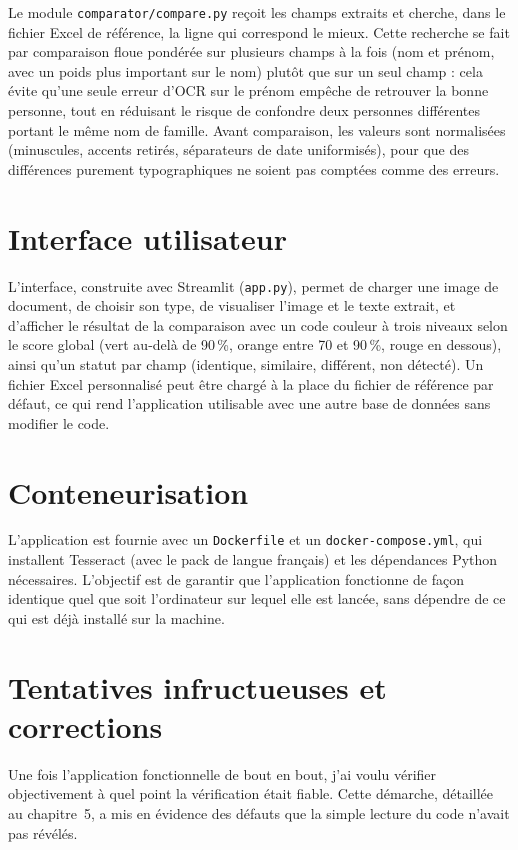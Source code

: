 Le module \texttt{comparator/compare.py} reçoit les champs extraits et cherche, dans le fichier Excel de référence, la ligne qui correspond le mieux. Cette recherche se fait par comparaison floue pondérée sur plusieurs champs à la fois (nom et prénom, avec un poids plus important sur le nom) plutôt que sur un seul champ : cela évite qu'une seule erreur d'OCR sur le prénom empêche de retrouver la bonne personne, tout en réduisant le risque de confondre deux personnes différentes portant le même nom de famille. Avant comparaison, les valeurs sont normalisées (minuscules, accents retirés, séparateurs de date uniformisés), pour que des différences purement typographiques ne soient pas comptées comme des erreurs.

\section{Interface utilisateur}

L'interface, construite avec Streamlit (\texttt{app.py}), permet de charger une image de document, de choisir son type, de visualiser l'image et le texte extrait, et d'afficher le résultat de la comparaison avec un code couleur à trois niveaux selon le score global (vert au-delà de 90\,\%, orange entre 70 et 90\,\%, rouge en dessous), ainsi qu'un statut par champ (identique, similaire, différent, non détecté). Un fichier Excel personnalisé peut être chargé à la place du fichier de référence par défaut, ce qui rend l'application utilisable avec une autre base de données sans modifier le code.

\section{Conteneurisation}

L'application est fournie avec un \texttt{Dockerfile} et un \texttt{docker-compose.yml}, qui installent Tesseract (avec le pack de langue français) et les dépendances Python nécessaires. L'objectif est de garantir que l'application fonctionne de façon identique quel que soit l'ordinateur sur lequel elle est lancée, sans dépendre de ce qui est déjà installé sur la machine.

\section{Tentatives infructueuses et corrections}
\label{sec:tentatives}

Une fois l'application fonctionnelle de bout en bout, j'ai voulu vérifier objectivement à quel point la vérification était fiable. Cette démarche, détaillée au chapitre~5, a mis en évidence des défauts que la simple lecture du code n'avait pas révélés.

